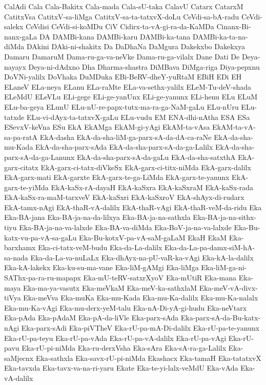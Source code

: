 {CalAdi
Cala
Cala-Bakitx
Cala-mada
Cala-sU-taka
CalavU
Catarx
CatarxM
CatitxVsa
CatitxV-sa-liMga
CatitxV-sa-ta-tatxvX-doLu
CeVdi-sa-bA-radu
CeVdi-salekx
CeVdisi
CeVdi-si-koMDu
CiV
Cidirx-ta-vA-gi-ra-da-KaMDa
Cinanx-Bi-nanx-gaLa
DA
DAMBi-kana
DAMBi-karu
DAMBi-ka-tana
DAMBi-ka-ta-na-diMda
DAkini
DAki-ni-shakitx
Da
DaDhaNa
DaMgura
Dakekxbo
Dakekxya
Damaru
DamaruM
Dama-ru-ga-va-neVke
Dama-ru-ga-vilalx
Dane
Dati
De
Deya-nayayx
Deya-ni-dAdxno
Dha
Dharma-shastra
DiMBava
DiMga-riga
Diya-pepxnu
DoVNi-yalilx
DoVhaka
DuMDuka
EBi-BeRV-dheY-yuRtaM
EBiH
EDi
EH
ELaneV
ELa-neya
ELanu
ELa-raMte
ELa-va-sethx-yalilx
ELeM-Tu-deV-shada
ELeMdU
ELeVLu
ELi-gege
ELi-ge-yanUnx
ELi-ge-yanunx
ELi-henu
ELu
ELuM
ELu-ba-geya
ELunU
ELu-nU-re-papx-tutx-ma-ra-ga-NaM-gaLu
ELu-nUru
ELu-tatxde
ELu-vi-dAyx-ta-tatxvX-gaLu
ELu-vudu
EM
ENA-dhi-nAtha
ESA
ESa
ESevxV-keVna
ESu
EkA
EkAMga
EkAM-gi-yAgi
EkAM-ta-vAsa
EkAM-ta-vA-sa-pa-ratA
EkA-dasha
EkA-da-sha-liM-ga-parx-sA-da-dA-ca-raNe
EkA-da-sha-mu-Kada
EkA-da-sha-parx-sAda
EkA-da-sha-parx-sA-da-ga-Lalilx
EkA-da-sha-parx-sA-da-ga-Lanunx
EkA-da-sha-parx-sA-da-gaLu
EkA-da-sha-satxthA
EkA-garx-citatx
EkA-garx-ci-tatx-diVkeSx
EkA-garx-ci-titx-niMda
EkA-garx-dalilx
EkA-garx-mati
EkA-garxte
EkA-garx-te-ga-LiMda
EkA-garx-te-yanunx
EkA-garx-te-yiMda
EkA-kaSx-rA-dayaH
EkA-kaSxra
EkA-kaSxraM
EkA-kaSx-rada
EkA-kaSx-ra-maM-tarxveV
EkA-kaSxri
EkA-kaSxroV
EkA-shAyx-di-rudarx
EkA-tamx-nAgi
EkA-thaR-vA-dalilx
EkA-thaR-vAgi
EkA-thaR-veM-da-ridu
Eka
Eka-BA-jana
Eka-BA-ja-na-da-lilxya
Eka-BA-ja-na-sathxla
Eka-BA-ja-na-sithx-tiyu
Eka-BA-ja-na-va-lalxde
Eka-BA-va-diMda
Eka-BoV-ja-na-va-lalxde
Eka-Bu-katx-vu-pa-vA-sa-gaLu
Eka-Bu-kotxV-pa-vA-saM-gaLaM
EkaH
EkaM
Eka-barxhamx
Eka-ci-tatx-veM-budu
Eka-da-La-dalilx
Eka-da-La-pa-damx-siM-hA-sa-nada
Eka-da-La-va-nuLaLx
Eka-dhAyx-na-pU-vaR-ka-vAgi
Eka-kA-la-dalilx
Eka-kA-lakekx
Eka-ku-su-ma-vane
Eka-liM-gAMgi
Eka-liMga
Eka-liM-ga-ni-SAThx-pa-ra-ru-mapapx
Eka-mU-teRV-satxrXyoV
Eka-mUtiR
Eka-mana
Eka-maya
Eka-ma-ya-vasutx
Eka-meVkaM
Eka-meV-ka-sathxlaM
Eka-meV-vA-divx-tiVya
Eka-meVva
Eka-muKa
Eka-mu-Kada
Eka-mu-Ka-dalilx
Eka-mu-Ka-nalalx
Eka-mu-Ka-vAgi
Eka-mu-derx-yeM-talu
Eka-nA-Di-yA-gi-hudu
Eka-neVtarx
Eka-pAda
Eka-pAdaM
Eka-pA-da-liVle
Eka-parx-sAda
Eka-parx-sA-da-Bu-katx-nAgi
Eka-parx-sAdi
Eka-piVTheV
Eka-rU-pa-mA-Di-dalilx
Eka-rU-pa-te-yanunx
Eka-rU-pa-teyu
Eka-rU-pa-vAda
Eka-rU-pa-vA-dalilx
Eka-rU-pa-vAgi
Eka-rU-pavu
Eka-rU-pi-niMda
Eka-ru-derxVsha
Eka-sAra
Eka-sA-ra-ga-Lalilx
Eka-saMjecnx
Eka-sathxla
Eka-savx-rU-pi-niMda
Ekashacx
Eka-tamaH
Eka-tatatxvX
Eka-tavxda
Eka-tavx-va-na-ri-yaru
Ekate
Eka-te-yi-lalx-veMdU
Eka-vAda
Eka-vA-dalilx
}
